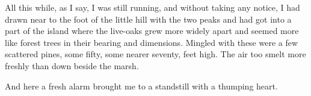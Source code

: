 All this while, as I say, I was still running, and without taking any notice, I had drawn near to the foot of the little hill with the two peaks and had got into a part of the island where the live-oaks grew more widely apart and seemed more like forest trees in their bearing and dimensions. Mingled with these were a few scattered pines, some fifty, some nearer seventy, feet high. The air too smelt more freshly than down beside the marsh.

And here a fresh alarm brought me to a standstill with a thumping heart.